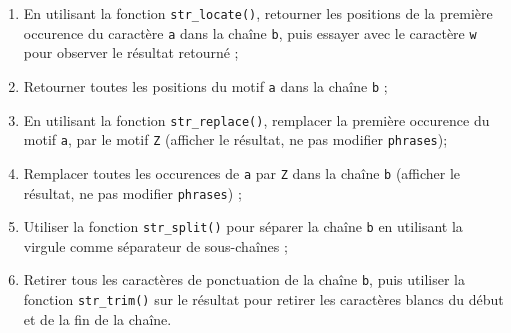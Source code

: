 \documentclass[
  11pt,
]{book}
\makeatletter
\numberwithin{equation}{section}
\numberwithin{countremarque}{section}
\newenvironment{exframe}{%
 \def\at@end@of@exframe{}%
 \ifinner\ifhmode%
  \def\at@end@of@exframe{\end{minipage}}%
  \begin{minipage}{\columnwidth}%
 \fi\fi%
 \def\FrameCommand##1{\hskip\@totalleftmargin \hskip-\fboxsep
 \colorbox{shadecolorex}{##1}\hskip-\fboxsep
     \hskip-\linewidth \hskip-\@totalleftmargin \hskip\columnwidth}%
 \MakeFramed {\advance\hsize-\width
   \@totalleftmargin\z@ \linewidth\hsize
   \@setminipage}}%
 {\par\unskip\endMakeFramed%
 \at@end@of@exframe}
\makeatother
\begin{document}
\begin{exframe}
\begin{enumerate}
\item
  En utilisant la fonction \texttt{str\_locate()}, retourner les positions de la première occurence du caractère \texttt{a} dans la chaîne \texttt{b}, puis essayer avec le caractère \texttt{w} pour observer le résultat retourné ;
\item
  Retourner toutes les positions du motif \texttt{a} dans la chaîne \texttt{b} ;
\item
  En utilisant la fonction \texttt{str\_replace()}, remplacer la première occurence du motif \texttt{a}, par le motif \texttt{Z} (afficher le résultat, ne pas modifier \texttt{phrases});
\item
  Remplacer toutes les occurences de \texttt{a} par \texttt{Z} dans la chaîne \texttt{b} (afficher le résultat, ne pas modifier \texttt{phrases}) ;
\item
  Utiliser la fonction \texttt{str\_split()} pour séparer la chaîne \texttt{b} en utilisant la virgule comme séparateur de sous-chaînes ;
\item
  Retirer tous les caractères de ponctuation de la chaîne \texttt{b}, puis utiliser la fonction \texttt{str\_trim()} sur le résultat pour retirer les caractères blancs du début et de la fin de la chaîne.
\end{enumerate}
\end{exframe}
\end{document}
